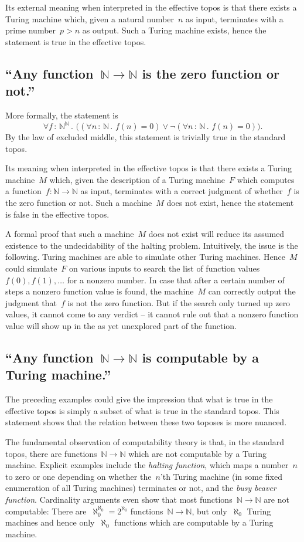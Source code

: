 \documentclass[oneside]{amsart}
\theoremstyle{definition}
\theoremstyle{plain}
\theoremstyle{remark}
\newcommand{\NN}{\mathbb{N}}
\renewcommand{\_}{\mathpunct{.}\,}
\newcommand{\effective}{ef{}fective\xspace}
\newcommand{\?}{\,{:}\,}
\begin{document}
Its external meaning when interpreted in the \effective topos is that there exists
a Turing machine which, given a natural number~$n$ as input, terminates with a
prime number~$p > n$ as output. Such a Turing machine exists, hence the
statement is true in the \effective topos.


\subsection*{``Any function~$\NN \to \NN$ is the zero function or not.''} More
formally, the statement is
\[ \forall f \? \NN^\NN\_
  \bigl((\forall n \? \NN\_ f(n) = 0) \vee
  \neg
  (\forall n \? \NN\_ f(n) = 0)\bigr). \]
By the law of excluded middle, this statement is trivially true in the standard
topos.

Its meaning when interpreted in the \effective topos is that there exists a
Turing machine~$M$ which, given the description of a Turing machine~$F$ which
computes a function~$f : \NN \to \NN$ as input, terminates with a correct
judgment of whether~$f$ is the zero function or not. Such a machine~$M$ does
not exist, hence the statement is false in the \effective topos.

A formal proof that such a machine~$M$ does not exist will reduce its assumed
existence to the undecidability of the halting problem. Intuitively, the issue
is the following. Turing machines are able to simulate other Turing machines.
Hence~$M$ could simulate~$F$ on various inputs to search the list of
function values~$f(0), f(1), \ldots$ for a nonzero number. In case that after
a certain number of steps a nonzero function value is found, the machine~$M$
can correctly output the judgment that~$f$ is not the zero function. But if the
search only turned up zero values, it cannot come to any verdict -- it cannot
rule out that a nonzero function value will show up in the as yet unexplored
part of the function.


\subsection*{``Any function~$\NN \to \NN$ is computable by a Turing machine.''}
The preceding examples could give the impression that what is true in the
\effective topos is simply a subset of what is true in the standard topos. This
statement shows that the relation between these two toposes is more nuanced.

The fundamental observation of computability theory is that, in the standard
topos, there are functions~$\NN \to \NN$ which are not computable by a Turing
machine. Explicit examples include the \emph{halting
function}, which maps a number~$n$ to zero or one depending on whether
the~$n$'th Turing machine (in some fixed enumeration of all Turing machines)
terminates or not, and the \emph{busy beaver function}. Cardinality arguments
even show that most functions~$\NN \to \NN$ are not computable: There
are~$\aleph_0^{\aleph_0} = 2^{\aleph_0}$ functions~$\NN \to \NN$, but
only~$\aleph_0$ Turing machines and hence only~$\aleph_0$ functions which are
computable by a Turing machine.
\end{document}
